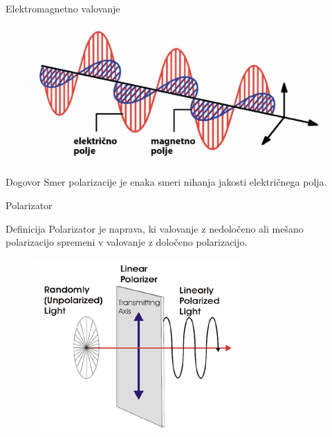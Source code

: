 \documentclass{beamer}
\begin{document}
\begin{frame}{Elektromagnetno valovanje}

\begin{figure}
\centering
\includegraphics[scale=0.75]{emv}
\end{figure}

\begin{block}{Dogovor}
Smer polarizacije je enaka smeri nihanja jakosti električnega polja.
\end{block}

\end{frame}


\begin{frame}{Polarizator}

\begin{block}{Definicija}
Polarizator je naprava, ki valovanje z nedoločeno ali mešano polarizacijo spremeni v valovanje z določeno polarizacijo.
\end{block}

\begin{figure}
\centering
\includegraphics[scale=0.6]{linear-figure-1}
\end{figure}

\end{frame}
\end{document}
